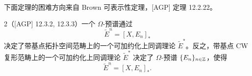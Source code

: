下面定理的困难方向来自 Brown 可表示性定理，[AGP] 定理 12.2.22。

\begin{thm}{2}（[AGP] 12.3.2, 12.3.3）一个 $\Omega$-预谱通过
\[ \widetilde{E}^n = [X, E_n]_* \]
决定了带基点拓扑空间范畴上的一个可加约化上同调理论 $\widetilde{E}^*$。反之，带基点 CW 复形范畴上的一个可加约化上同调理论 $\widetilde{E}^*$ 决定了 $\Omega$-预谱 $\{E_n\}_{n\in\mathbb{Z}}$，使得
\[ \widetilde{E}^n = [X, E_n]_*. \]
\end{thm}

